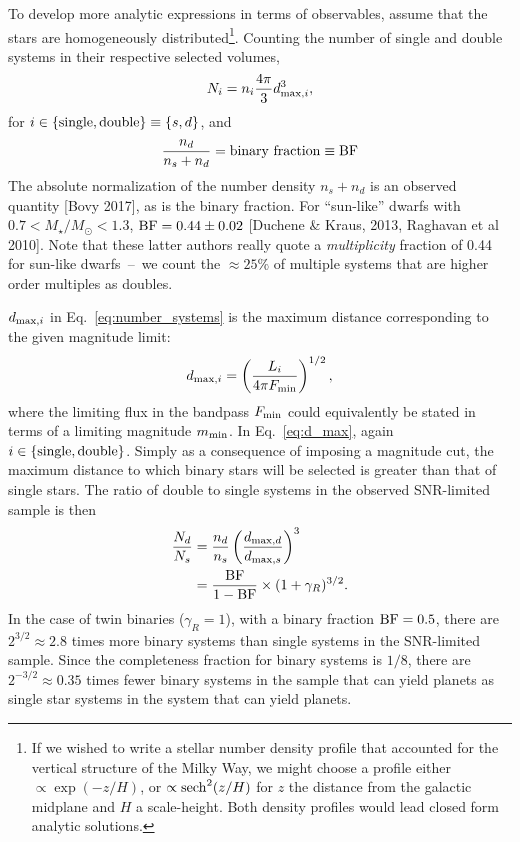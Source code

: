 \documentclass{emulateapj}
\begin{document}
To develop more analytic expressions in terms of observables, assume that the 
stars are homogeneously distributed\footnote{
If we wished to write a stellar number density profile that accounted for the 
vertical structure of the Milky Way, we might choose a profile either $\propto 
\exp(-z/H)$, or $\propto {\rm sech}^2(z/H)$ for $z$ the distance from the 
galactic midplane and $H$ a scale-height. Both density profiles would lead 
closed form analytic solutions.	}.
Counting the number of single and double systems in their respective selected 
volumes,
\begin{equation}
N_i = n_{i} \frac{4\pi}{3} d_{{\rm max},i}^3,
\label{eq:number_systems}
\end{equation}
for $i\in{\rm \{single,double\} } \equiv { \{s,d\} }$, and
\begin{equation}
\frac{n_{d}}{n_s+n_d} = {\rm binary\ fraction} \equiv {\rm BF}
\end{equation}
The absolute normalization of the number density $n_s + n_d$ is an observed
quantity [Bovy 2017], as is the binary fraction.
For ``sun-like'' dwarfs with $0.7<M_\star/M_\odot<1.3$,
${\rm BF}=0.44\pm0.02$ [Duchene \& Kraus, 2013, Raghavan et al 2010]. 
Note that these latter authors really quote a {\it multiplicity} fraction of
0.44 for sun-like dwarfs~--~we count the $\approx 25\%$ of multiple 
systems that are higher order multiples as doubles.

$d_{{\rm max},i}$ in Eq.~\ref{eq:number_systems} is the maximum distance 
corresponding to the given magnitude limit:
\begin{equation}
d_{{\rm max},i} = \left(\frac{L_{i}}{4 \pi F_{{\rm min}}}\right)^{1/2},
\label{eq:d_max}
\end{equation}
where the limiting flux in the bandpass $F_{{\rm min}}$ could equivalently be 
stated in terms of a limiting magnitude $m_{{\rm min}}$.
In Eq.~\ref{eq:d_max}, again $i\in{\rm \{single,double\} }$. Simply as a 
consequence of imposing a magnitude cut, the maximum distance to which binary 
stars will be selected is greater than that of single stars.
The ratio of double to single systems in the observed SNR-limited sample is 
then
\begin{align}
\frac{N_d}{N_s} &= 
	\frac{n_d}{n_s}
	\left( \frac{d_{{\rm max}, d} }{d_{{\rm max}, s}} \right)^3 \\
&= \frac{{\rm BF}}{1 - {\rm BF}} \times (1+\gamma_R)^{3/2}.
\end{align}
In the case of twin binaries ($\gamma_R = 1$), with a binary fraction 
${\rm BF} = 0.5$, there are 
$2^{3/2}\approx2.8$ times more binary systems than single systems in the 
SNR-limited sample.
Since the completeness fraction for binary systems is $1/8$, there are 
$2^{-3/2}\approx0.35$ times fewer binary systems in the sample that can yield 
planets as single star systems in the system that can yield planets.
\end{document}
